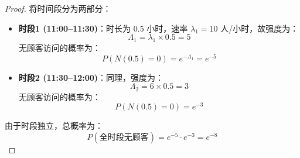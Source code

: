 \documentclass[lang=cn,10pt,thmcnt=section]{elegantbook}
\begin{document}
\begin{proof}
	
将时间段分为两部分：
\begin{itemize}
  \item \textbf{时段1 (11:00--11:30)}：时长为 0.5 小时，速率 $\lambda_1 = 10$ 人/小时，故强度为：
    \[
    \Lambda_1 = \lambda_1 \times 0.5 = 5
    \]
    无顾客访问的概率为：
    \[
    P(N(0.5) = 0) = e^{-\Lambda_1} = e^{-5}
    \]
  
  \item \textbf{时段2 (11:30--12:00)}：同理，强度为：
    \[
    \Lambda_2 = 6 \times 0.5 = 3
    \]
    无顾客访问的概率为：
    \[
    P(N(0.5) = 0) = e^{-3}
    \]
\end{itemize}

由于时段独立，总概率为：
\[
P(\text{全时段无顾客}) = e^{-5} \cdot e^{-3} = e^{-8}
\]

\end{proof}
\end{document}

